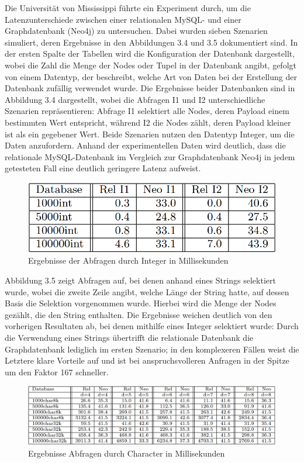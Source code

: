 \noindent
Die Universität von Mississippi führte ein Experiment durch, um die Latenzunterschiede zwischen einer relationalen MySQL- und einer Graphdatenbank (Neo4j) zu untersuchen. Dabei wurden sieben Szenarien simuliert, deren Ergebnisse in den Abbildungen 3.4 und 3.5 dokumentiert sind. In der ersten Spalte der Tabellen wird die Konfiguration der Datenbank dargestellt, wobei die Zahl die Menge der Nodes oder Tupel in der Datenbank angibt, gefolgt von einem Datentyp, der beschreibt, welche Art von Daten bei der Erstellung der Datenbank zufällig verwendet wurde. Die Ergebnisse beider Datenbanken sind in Abbildung 3.4 dargestellt, wobei die Abfragen I1 und I2 unterschiedliche Szenarien repräsentieren: Abfrage I1 selektiert alle Nodes, deren Payload einem bestimmten Wert entspricht, während I2 die Nodes zählt, deren Payload kleiner ist als ein gegebener Wert. Beide Szenarien nutzen den Datentyp Integer, um die Daten anzufordern. Anhand der experimentellen Daten wird deutlich, dass die relationale MySQL-Datenbank im Vergleich zur Graphdatenbank Neo4j in jedem getesteten Fall eine deutlich geringere Latenz aufweist. 
 \citep{graphrelationaldb}
\begin{figure}[H]
	\centering
	\includegraphics[scale=.5]{Illustrations/dbresultsint.png}
	\caption{Ergebnisse der Abfragen durch Integer in Millisekunden \citep{graphrelationaldb}}
\end{figure}
\noindent
Abbildung 3.5 zeigt Abfragen auf, bei denen anhand eines Strings selektiert wurde, wobei die zweite Zeile angibt, welche Länge der String hatte, auf dessen Basis die Selektion vorgenommen wurde. Hierbei wird die Menge der Nodes gezählt, die den String enthalten. Die Ergebnisse weichen deutlich von den vorherigen Resultaten ab, bei denen mithilfe eines Integer selektiert wurde: Durch die Verwendung eines Strings übertrifft die relationale Datenbank die Graphdatenbank lediglich im ersten Szenario; in den komplexeren Fällen weist die Letztere klare Vorteile auf und ist bei anspruchsvolleren Anfragen in der Spitze um den Faktor 167 schneller. 
 \citep{graphrelationaldb}
\begin{figure}[H]
	\centering
	\includegraphics[scale=.425]{Illustrations/dbresultschar.png}
	\caption{Ergebnisse Abfragen durch Character  in Millisekunden \citep{graphrelationaldb}}
\end{figure}
